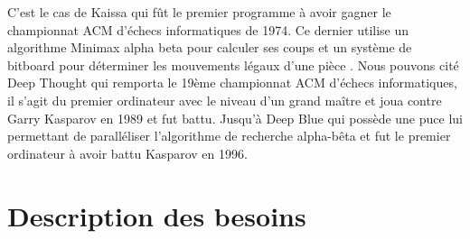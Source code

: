 \documentclass{article}
\begin{document}
\newline
C'est le cas de Kaissa qui fût le premier programme à avoir gagner le championnat ACM d'échecs informatiques de 1974. Ce dernier utilise un algorithme Minimax alpha beta \cite{KaissaAB} pour calculer ses coups et un système de bitboard pour déterminer les mouvements légaux d'une pièce \cite{KaissaBitboard}.
\newline
Nous pouvons cité Deep Thought qui remporta le 19ème championnat ACM d'échecs informatiques, il s'agit du premier ordinateur avec le niveau d'un grand maître et joua contre Garry Kasparov en 1989 et fut battu\cite{Deep}. 
\newline
Jusqu'à Deep Blue qui possède une puce lui permettant de paralléliser l'algorithme de recherche alpha-bêta\cite{DeepSystem} et fut le premier ordinateur à avoir battu Kasparov en 1996\cite{Deep}.
\newpage
\section{Description des besoins}

\end{document}
